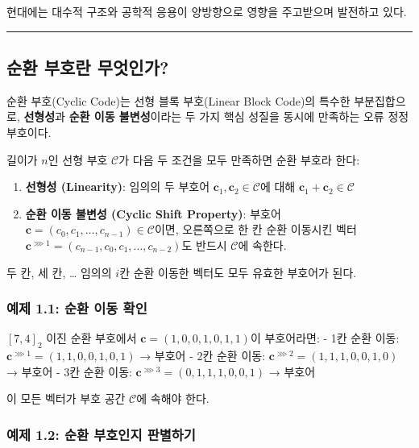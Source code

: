 \documentclass[
  oneside]{article}
\providecommand{\tightlist}{%
  \setlength{\itemsep}{0pt}\setlength{\parskip}{0pt}}
\begin{document}
현대에는 대수적 구조와 공학적 응용이 양방향으로 영향을 주고받으며
발전하고 있다.

\begin{center}\rule{0.5\linewidth}{0.5pt}\end{center}

\subsection{순환 부호란
무엇인가?}\label{uxc21cuxd658-uxbd80uxd638uxb780-uxbb34uxc5c7uxc778uxac00}

순환 부호(Cyclic Code)는 선형 블록 부호(Linear Block Code)의 특수한
부분집합으로, \textbf{선형성}과 \textbf{순환 이동 불변성}이라는 두 가지
핵심 성질을 동시에 만족하는 오류 정정 부호이다.

길이가 \(n\)인 선형 부호 \(\mathcal{C}\)가 다음 두 조건을 모두 만족하면
순환 부호라 한다:

\begin{enumerate}
\def\labelenumi{\arabic{enumi}.}
\tightlist
\item
  \textbf{선형성 (Linearity)}: 임의의 두 부호어
  \(\mathbf{c}_1, \mathbf{c}_2 \in \mathcal{C}\)에 대해
  \(\mathbf{c}_1 + \mathbf{c}_2 \in \mathcal{C}\)
\item
  \textbf{순환 이동 불변성 (Cyclic Shift Property)}: 부호어
  \(\mathbf{c} = (c_0, c_1, \dots, c_{n-1}) \in \mathcal{C}\)이면,
  오른쪽으로 한 칸 순환 이동시킨 벡터
  \(\mathbf{c}^{\ggg 1}= (c_{n-1}, c_0, c_1, \dots, c_{n-2})\)도 반드시
  \(\mathcal{C}\)에 속한다.
\end{enumerate}

두 칸, 세 칸, \ldots{} 임의의 \(i\)칸 순환 이동한 벡터도 모두 유효한
부호어가 된다.

\subsubsection{예제 1.1: 순환 이동
확인}\label{uxc608uxc81c-1.1-uxc21cuxd658-uxc774uxb3d9-uxd655uxc778}

\([7, 4]_2\) 이진 순환 부호에서 \(\mathbf{c} = (1, 0, 0, 1, 0, 1, 1)\)이
부호어라면: - 1칸 순환 이동:
\(\mathbf{c}^{\ggg 1} = (1, 1, 0, 0, 1, 0, 1)\) → 부호어 - 2칸 순환
이동: \(\mathbf{c}^{\ggg 2} = (1, 1, 1, 0, 0, 1, 0)\) → 부호어 - 3칸
순환 이동: \(\mathbf{c}^{\ggg 3} = (0, 1, 1, 1, 0, 0, 1)\) → 부호어

이 모든 벡터가 부호 공간 \(\mathcal{C}\)에 속해야 한다.

\subsubsection{예제 1.2: 순환 부호인지
판별하기}\label{uxc608uxc81c-1.2-uxc21cuxd658-uxbd80uxd638uxc778uxc9c0-uxd310uxbcc4uxd558uxae30}
\end{document}
